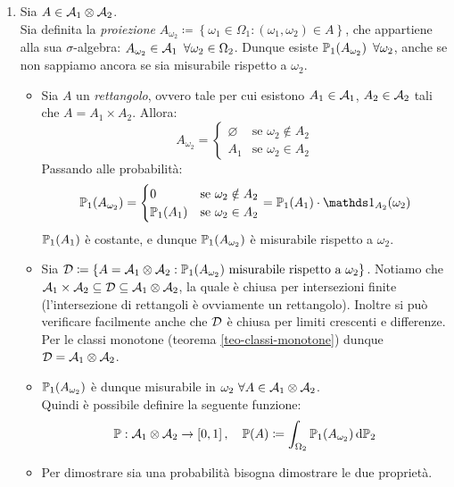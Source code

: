 \medskip
\begin{dimo}
  \Fixvmode
  \begin{enumerate}
    \item Sia $A \in \mathcal A_1 \otimes \mathcal A_2$. \\
    Sia definita la \textit{proiezione} $A_{\omega_2} \coloneqq \left \{ \omega_1 \in \Omega_1: (\omega_1,\omega_2) \in A \right \}$, che appartiene alla sua $\sigma$-algebra: $A_{\omega_2} \in \mathcal A_1 \enspace \forall \omega_2 \in \Omega_2$. Dunque esiste $\mathbb P_1(A_{\omega_2}) \enspace \forall \omega_2$, anche se non sappiamo ancora se sia misurabile rispetto a $\omega_2$.
    \begin{itemize}
      \item Sia $A$ un \textit{rettangolo}, ovvero tale per cui esistono $A_1 \in \mathcal A_1$, $A_2 \in \mathcal A_2$ tali che $A=A_1 \times A_2$.
      Allora: $$A_{\omega_2}=\begin{cases} \varnothing & \text{se } \omega_2 \notin A_2 \\ A_1 & \text{se } \omega_2 \in A_2 \end{cases}$$
      Passando alle probabilità:
      $$\PP_1(A_{\omega_2})= \begin{cases} 0 & \text{se } \omega_2 \notin A_2 \\ \PP_1(A_1) & \text{se } \omega_2 \in A_2 \end{cases}= \PP_1(A_1) \cdot \Ind_{A_2}(\omega_2) $$
          $\mathbb P_1(A_1)$ è costante, e dunque $\mathbb P_1(A_{\omega_2})$ è misurabile rispetto a $\omega_2$.
      \item Sia $ \mathcal D \coloneqq \left \{ A= \mathcal A_1\otimes\mathcal A_2 : \mathbb P_1(A_{\omega_2}) \text{ misurabile rispetto a } \omega_2 \right \}$. Notiamo che $\mathcal A_1 \times \mathcal A_2 \subseteq \mathcal D \subseteq \mathcal A_1\otimes\mathcal A_2$, la quale è chiusa per intersezioni finite (l'intersezione di rettangoli è ovviamente un rettangolo). Inoltre si può verificare facilmente anche che $\mathcal D$ è chiusa per limiti crescenti e differenze. Per le classi monotone (teorema \ref{teo-classi-monotone}) dunque $\mathcal D=\mathcal A_1 \otimes \mathcal A_2$.
      \item $\mathbb P_1(A_{\omega_2})$ è dunque misurabile in $\omega_2 \ \forall A \in \mathcal A_1 \otimes \mathcal A_2$. \\
          Quindi è possibile definire la seguente funzione:
          $$\mathbb P:\mathcal A_1 \otimes \mathcal A_2 \to \left [0,1 \right ], \quad \mathbb P(A) \coloneqq \int_{\Omega_2} \mathbb P_1(A_{\omega_2}) \, \mathrm d \mathbb P_2$$
      \item Per dimostrare sia una probabilità bisogna dimostrare le due proprietà.

\end{itemize}
\end{enumerate}
\end{dimo}

